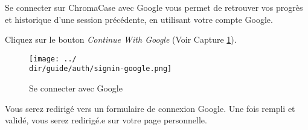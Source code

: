 Se connecter sur ChromaCase avec Google vous permet de retrouver vos progrès et historique d’une session précédente, en utilisant votre compte Google.


Cliquez sur le bouton \textit{Continue With Google} (Voir Capture \ref{fig:signin-google}).

\begin{figure}[H]
	\begin{center}
		\texttt{[image: ../\\dir/guide/auth/signin-google.png]}
		\caption{Se connecter avec Google}
		\label{fig:signin-google}
	\end{center}
\end{figure}

Vous serez redirigé vers un formulaire de connexion Google. Une fois rempli et validé, vous serez redirigé.e sur votre page personnelle.